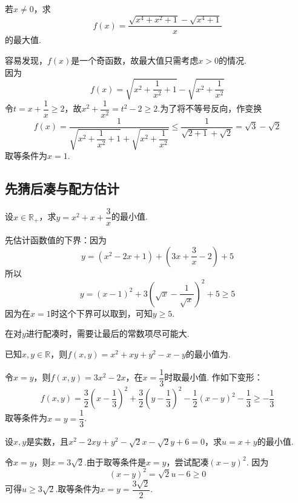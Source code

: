 \documentclass[cn,hazy,black,10pt,normal]{elegantnote}
\newenvironment{guess}{
  \color{guess}}{\newline \color{black}}
\newcommand{\tk}{\uline{\hspace{4em}}}
\newcommand{\ssb}[1]{\left( #1 \right)}
\newcommand{\R}{\mathbb{R}}
\begin{document}
\begin{problem} %
	若$x \neq 0$，求$$f(x)= \frac{\sqrt{x^4+x^2+1} - \sqrt{x^4+1}}{x}$$的最大值.
\end{problem}
\begin{solution}
	容易发现，$f(x)$是一个奇函数，故最大值只需考虑$x>0$的情况. \\
	因为$$f(x) = \sqrt{x^2+\frac{1}{x^2} + 1} - \sqrt{x^2 + \frac{1}{x^2}}$$
	令$t=x + \dfrac{1}{x} \geq 2$，故$x^2 + \dfrac{1}{x^2} = t^2 - 2 \geq 2$.为了将不等号反向，作变换$$f(x) = \frac{1}{\sqrt{x^2+\dfrac{1}{x^2} + 1} + \sqrt{x^2 + \dfrac{1}{x^2}}} \leq \frac{1}{\sqrt{2+1} + \sqrt{2}} = \sqrt{3} - \sqrt{2}$$
	取等条件为$x=1$.
\end{solution}

\subsection{先猜后凑与配方估计}

\begin{problem} %
	设$x \in \R _{+}$，求$y=x^2+x+\dfrac{3}{x}$的最小值.
\end{problem}
\begin{solution}
	先估计函数值的下界：因为$$y = (x^2 - 2x + 1) + \ssb{3x + \frac{3}{x} - 2} + 5$$
	所以$$y = (x-1)^2 + 3\ssb{\sqrt{x} - \frac{1}{\sqrt{x}}}^2 + 5 \geq 5$$
	因为在$x=1$时这个下界可以取到，可知$y \geq 5$.
\end{solution}
\begin{remark}
	在对$y$进行配凑时，需要让最后的常数项尽可能大.
\end{remark}

\begin{problem} %
	已知$x,y \in \R$，则$f(x,y) = x^2+xy+y^2-x-y$的最小值为\tk .
\end{problem}
\begin{solution}
	\begin{guess}
		令$x=y$，则$f(x,y) = 3x^2-2x$，在$x=\dfrac{1}{3}$时取最小值.
	\end{guess}
	作如下变形：$$f(x,y) = \frac{3}{2}\ssb{x-\frac{1}{3}}^2 + \frac{3}{2}\ssb{y-\frac{1}{3}}^2 - \frac{1}{2}(x-y)^2 - \frac{1}{3} \geq -\frac{1}{3}$$
	取等条件为$x=y=\dfrac{1}{3}$.
\end{solution}

\begin{problem} %
	设$x,y$是实数，且$x^2-2xy+y^2-\sqrt{2}x-\sqrt{2}y+6=0$，求$u=x+y$的最小值.
\end{problem}
\begin{solution}
	\begin{guess}
		令$x=y$，则$x=3\sqrt{2}$.由于取等条件是$x=y$，尝试配凑$(x-y)^2$.
	\end{guess}
	因为$$(x-y)^2 = \sqrt{2}u-6 \geq 0$$
	可得$u \geq 3\sqrt{2}$.取等条件为$x=y=\dfrac{3\sqrt{2}}{2}$.
\end{solution}
\end{document}

